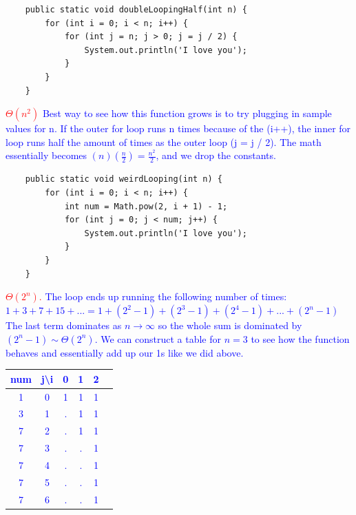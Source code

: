 \documentclass[11pt,letterpaper]{article}
\begin{document}
\begin{lstlisting}
    public static void doubleLoopingHalf(int n) {
        for (int i = 0; i < n; i++) {
            for (int j = n; j > 0; j = j / 2) {
                System.out.println('I love you');
            }
        }
    }
\end{lstlisting}
\textcolor{red}{$\Theta(n^2)$} \newline
\textcolor{blue}{Best way to see how this function grows is to try plugging in sample values for n. If the outer for loop runs n times because of the (i++), the inner for loop runs half the amount of times as the outer loop (j = j / 2). The math essentially becomes $(n)(\frac{n}{2}) = \frac{n^2}{2}$, and we drop the constants.}
\pspace
\pspace

\begin{lstlisting}
    public static void weirdLooping(int n) {
        for (int i = 0; i < n; i++) {
            int num = Math.pow(2, i + 1) - 1;
            for (int j = 0; j < num; j++) {
                System.out.println('I love you');
            }
        }
    }
\end{lstlisting}
\textcolor{red}{$\Theta(2^n).$} 
\textcolor{blue}{The loop ends up running the following number of times:}
\newline
\textcolor{blue}{$1 + 3 + 7 + 15 + ... = 1 + (2^2 - 1) + (2^3 - 1) + (2^4 - 1) + ... + (2^n - 1)$}
\textcolor{blue}{The last term dominates as $n \rightarrow \infty$ so the whole sum is dominated by $(2^n - 1) \sim \Theta(2^n)$. We can construct a table for $n=3$ to see how the function behaves and essentially add up our 1s like we did above.}
\textcolor{blue}{
\begin{center}
\begin{tabular}{ |c|c|c|c|c|c| } 
\hline
num & j\textbackslash i & 0 & 1 & 2\\
\hline
1 & 0 & 1 & 1 & 1 \\ 
3 & 1 & . & 1 & 1 \\ 
7 & 2 & . & 1 & 1 \\
7 & 3 & . & . & 1 \\
7 & 4 & . & . & 1 \\
7 & 5 & . & . & 1 \\
7 & 6 & . & . & 1 \\
\hline
\end{tabular}
\end{center}}

\newpage
\end{document}
